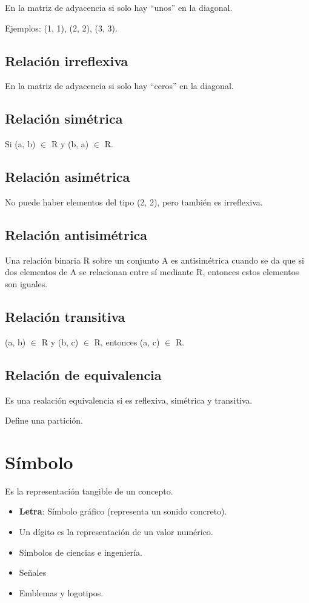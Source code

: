 \documentclass{article}
\begin{document}
En la matriz de adyacencia si solo hay ``unos'' en la diagonal.

Ejemplos: (1, 1), (2, 2), (3, 3).

\subsection{Relación irreflexiva}

En la matriz de adyacencia si solo hay ``ceros'' en la diagonal.

\subsection{Relación simétrica}
Si (a, b) $\in$ R y (b, a) $\in$ R.

\subsection{Relación asimétrica}
No puede haber elementos del tipo (2, 2), pero también es irreflexiva.

\subsection{Relación antisimétrica}
Una relación binaria R sobre un conjunto A es antisimétrica cuando se da que
si dos elementos de A se relacionan entre sí mediante R, entonces estos elementos son iguales.

\subsection{Relación transitiva}
(a, b) $\in$ R y (b, c) $\in$ R, entonces (a, c) $\in$ R.

\subsection{Relación de equivalencia}

Es una realación equivalencia si es reflexiva, simétrica y transitiva.

Define una partición.

\section{Símbolo}

Es la representación tangible de un concepto.

\begin{itemize}
	\item
	\textbf{Letra}: Símbolo gráfico (representa un sonido concreto).
	\item
	Un dígito es la representación de un valor numérico.
	\item
	Símbolos de ciencias e ingeniería.
	\item
	Señales
	\item
	Emblemas y logotipos.
\end{itemize}
\end{document}
